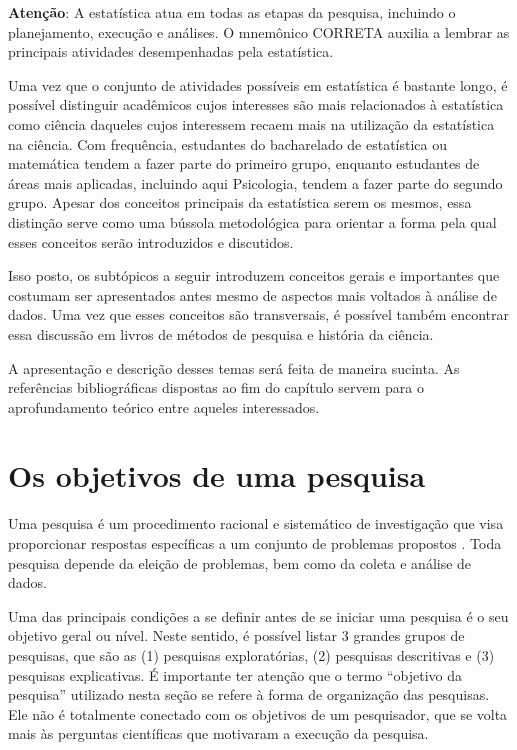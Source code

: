 \documentclass[
]{book}
\newenvironment{warning}{
  \definecolor{shadecolor}{rgb}{0, 0, 0}  %
  \color{white}
  \begin{shaded}}
 {\end{shaded}}
\begin{document}
\begin{warning}

\textbf{Atenção}: A estatística atua em todas as etapas da pesquisa, incluindo o planejamento, execução e análises. O mnemônico CORRETA auxilia a lembrar as principais atividades desempenhadas pela estatística.

\end{warning}

Uma vez que o conjunto de atividades possíveis em estatística é bastante longo, é possível distinguir acadêmicos cujos interesses são mais relacionados à estatística como ciência daqueles cujos interessem recaem mais na utilização da estatística na ciência. Com frequência, estudantes do bacharelado de estatística ou matemática tendem a fazer parte do primeiro grupo, enquanto estudantes de áreas mais aplicadas, incluindo aqui Psicologia, tendem a fazer parte do segundo grupo. Apesar dos conceitos principais da estatística serem os mesmos, essa distinção serve como uma bússola metodológica para orientar a forma pela qual esses conceitos serão introduzidos e discutidos.

Isso posto, os subtópicos a seguir introduzem conceitos gerais e importantes que costumam ser apresentados antes mesmo de aspectos mais voltados à análise de dados. Uma vez que esses conceitos são transversais, é possível também encontrar essa discussão em livros de métodos de pesquisa e história da ciência.

A apresentação e descrição desses temas será feita de maneira sucinta. As referências bibliográficas dispostas ao fim do capítulo servem para o aprofundamento teórico entre aqueles interessados.

\hypertarget{os-objetivos-de-uma-pesquisa}{%
\section{Os objetivos de uma pesquisa}\label{os-objetivos-de-uma-pesquisa}}

Uma pesquisa é um procedimento racional e sistemático de investigação que visa proporcionar respostas específicas a um conjunto de problemas propostos \citep{gil2002}. Toda pesquisa depende da eleição de problemas, bem como da coleta e análise de dados.

Uma das principais condições a se definir antes de se iniciar uma pesquisa é o seu objetivo geral ou nível. Neste sentido, é possível listar 3 grandes grupos de pesquisas, que são as (1) pesquisas exploratórias, (2) pesquisas descritivas e (3) pesquisas explicativas. É importante ter atenção que o termo ``objetivo da pesquisa'' utilizado nesta seção se refere à forma de organização das pesquisas. Ele não é totalmente conectado com os objetivos de um pesquisador, que se volta mais às perguntas científicas que motivaram a execução da pesquisa.
\end{document}
